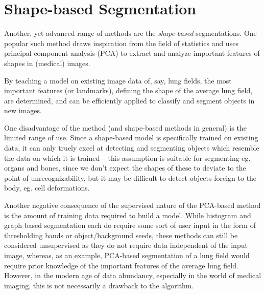 \section{Shape-based Segmentation}

Another, yet advanced range of methods are the \textit{shape-based}
segmentations. One popular such method draws inspiration from the field of
statistics and uses principal component analysis (PCA) to extract and analyze
important features of shapes in (medical) images.

By teaching a model on existing image data of, say, lung fields, the most
important features (or landmarks), defining the shape of the average lung field,
are determined, and can be efficiently applied to classify and segment objects
in new images.

One disadvantage of the method (and shape-based methods in general) is the
limited range of use. Since a shape-based model is specifically trained on
existing data, it can only truely excel at detecting and segmenting objects
which resemble the data on which it is trained -- this assumption is suitable
for segmenting eg. organs and bones, since we don't expect the shapes of these
to deviate to the point of unrecognizability, but it may be difficult to detect
objects foreign to the body, eg. cell deformations.

Another negative consequence of the supervised nature of the PCA-based method is
the amount of training data required to build a model. While histogram and graph
based segmentation each do require some sort of user input in the form of
thresholding bands or object/background seeds, these methods can still be
considered unsupervised as they do not require data independent of the input
image, whereas, as an example, PCA-based segmentation of a lung field would
require prior knowledge of the important features of the average lung field.
However, in the modern age of data abundancy, especially in the world of medical
imaging, this is not necessarily a drawback to the algorithm.

\sectend
